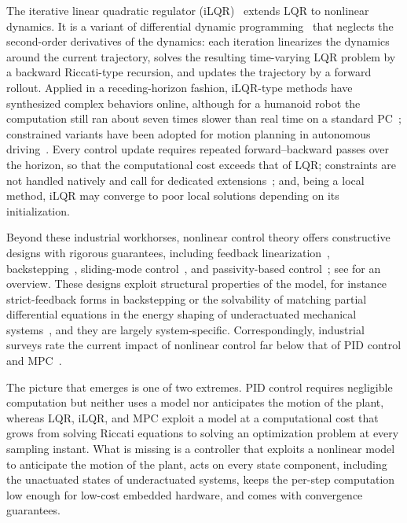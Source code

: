 The iterative linear quadratic regulator (iLQR)~\citep{li2004iterative} extends LQR to
nonlinear dynamics.
It is a variant of differential dynamic programming~\citep{mayne1966second} that neglects the
second-order derivatives of the dynamics: each iteration linearizes the dynamics around the
current trajectory, solves the resulting time-varying LQR problem by a backward Riccati-type
recursion, and updates the trajectory by a forward rollout.
Applied in a receding-horizon fashion, iLQR-type methods have synthesized complex behaviors
online, although for a humanoid robot the computation still ran about seven times slower than
real time on a standard PC~\citep{tassa2012synthesis}; constrained variants have been adopted
for motion planning in autonomous driving~\citep{chen2017constrained,chen2019autonomous}.
Every control update requires repeated forward--backward passes over the horizon, so that the
computational cost exceeds that of LQR; constraints are not handled natively and call for
dedicated extensions~\citep{tassa2014control,chen2019autonomous}; and, being a local method,
iLQR may converge to poor local solutions depending on its initialization.

Beyond these industrial workhorses, nonlinear control theory offers constructive designs with
rigorous guarantees, including feedback linearization~\citep{isidori1995nonlinear},
backstepping~\citep{krstic1995nonlinear}, sliding-mode control~\citep{utkin1977variable}, and
passivity-based control~\citep{ortega2002interconnection}; see \citet{khalil2002nonlinear} for
an overview.
These designs exploit structural properties of the model, for instance strict-feedback forms in
backstepping or the solvability of matching partial differential equations in the energy
shaping of underactuated mechanical systems~\citep{ortega2002stabilization}, and they are
largely system-specific.
Correspondingly, industrial surveys rate the current impact of nonlinear control far below that
of PID control and MPC~\citep{samad2020industry}.

The picture that emerges is one of two extremes.
PID control requires negligible computation but neither uses a model nor anticipates the motion
of the plant, whereas LQR, iLQR, and MPC exploit a model at a computational cost that grows from
solving Riccati equations to solving an optimization problem at every sampling instant.
What is missing is a controller that exploits a nonlinear model to anticipate the motion of the
plant, acts on every state component, including the unactuated states of underactuated systems,
keeps the per-step computation low enough for low-cost embedded hardware, and comes with
convergence guarantees.

